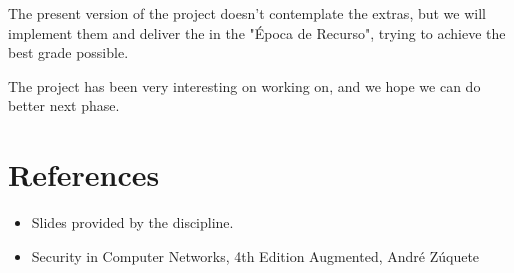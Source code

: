 \documentclass[pdftex,12pt,a4paper]{report}
\begin{document}
The present version of the project doesn't contemplate the extras, but we will implement them and deliver the in the "Época de Recurso", trying to achieve the best grade possible.

The project has been very interesting on working on, and we hope we can do better next phase.

\newpage
\section{References}
\begin{itemize}  
\item Slides provided by the discipline.
\item Security in Computer Networks, 4th Edition Augmented, André Zúquete
\end{itemize}
\end{document}
